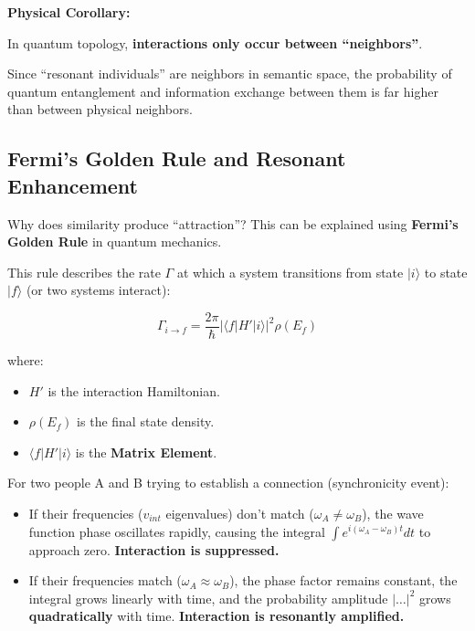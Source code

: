 \textbf{Physical Corollary:}

In quantum topology, \textbf{interactions only occur between ``neighbors''}.

Since ``resonant individuals'' are neighbors in semantic space, the probability of quantum entanglement and information exchange between them is far higher than between physical neighbors.

\subsection{Fermi's Golden Rule and Resonant Enhancement}

Why does similarity produce ``attraction''? This can be explained using \textbf{Fermi's Golden Rule} in quantum mechanics.

This rule describes the rate $\Gamma$ at which a system transitions from state $|i\rangle$ to state $|f\rangle$ (or two systems interact):

\[\Gamma_{i \to f} = \frac{2\pi}{\hbar} |\langle f | H' | i \rangle|^2 \rho(E_f)\]

where:

\begin{itemize}
\item \textbf{$H'$} is the interaction Hamiltonian.

\item \textbf{$\rho(E_f)$} is the final state density.

\item \textbf{$\langle f | H' | i \rangle$} is the \textbf{Matrix Element}.
\end{itemize}

For two people A and B trying to establish a connection (synchronicity event):

\begin{itemize}
\item If their frequencies ($v_{int}$ eigenvalues) don't match ($\omega_A \neq \omega_B$), the wave function phase oscillates rapidly, causing the integral $\int e^{i(\omega_A - \omega_B)t} dt$ to approach zero. \textbf{Interaction is suppressed.}

\item If their frequencies match ($\omega_A \approx \omega_B$), the phase factor remains constant, the integral grows linearly with time, and the probability amplitude $|\dots|^2$ grows \textbf{quadratically} with time. \textbf{Interaction is resonantly amplified.}
\end{itemize}


